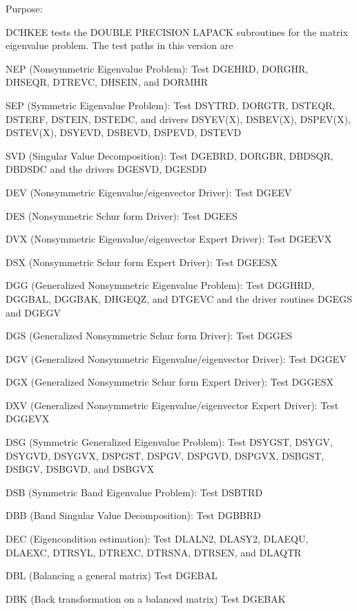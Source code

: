 \begin{DoxyParagraph}{Purpose\+: }
\begin{DoxyVerb} DCHKEE tests the DOUBLE PRECISION LAPACK subroutines for the matrix
 eigenvalue problem.  The test paths in this version are

 NEP (Nonsymmetric Eigenvalue Problem):
     Test DGEHRD, DORGHR, DHSEQR, DTREVC, DHSEIN, and DORMHR

 SEP (Symmetric Eigenvalue Problem):
     Test DSYTRD, DORGTR, DSTEQR, DSTERF, DSTEIN, DSTEDC,
     and drivers DSYEV(X), DSBEV(X), DSPEV(X), DSTEV(X),
                 DSYEVD,   DSBEVD,   DSPEVD,   DSTEVD

 SVD (Singular Value Decomposition):
     Test DGEBRD, DORGBR, DBDSQR, DBDSDC
     and the drivers DGESVD, DGESDD

 DEV (Nonsymmetric Eigenvalue/eigenvector Driver):
     Test DGEEV

 DES (Nonsymmetric Schur form Driver):
     Test DGEES

 DVX (Nonsymmetric Eigenvalue/eigenvector Expert Driver):
     Test DGEEVX

 DSX (Nonsymmetric Schur form Expert Driver):
     Test DGEESX

 DGG (Generalized Nonsymmetric Eigenvalue Problem):
     Test DGGHRD, DGGBAL, DGGBAK, DHGEQZ, and DTGEVC
     and the driver routines DGEGS and DGEGV

 DGS (Generalized Nonsymmetric Schur form Driver):
     Test DGGES

 DGV (Generalized Nonsymmetric Eigenvalue/eigenvector Driver):
     Test DGGEV

 DGX (Generalized Nonsymmetric Schur form Expert Driver):
     Test DGGESX

 DXV (Generalized Nonsymmetric Eigenvalue/eigenvector Expert Driver):
     Test DGGEVX

 DSG (Symmetric Generalized Eigenvalue Problem):
     Test DSYGST, DSYGV, DSYGVD, DSYGVX, DSPGST, DSPGV, DSPGVD,
     DSPGVX, DSBGST, DSBGV, DSBGVD, and DSBGVX

 DSB (Symmetric Band Eigenvalue Problem):
     Test DSBTRD

 DBB (Band Singular Value Decomposition):
     Test DGBBRD

 DEC (Eigencondition estimation):
     Test DLALN2, DLASY2, DLAEQU, DLAEXC, DTRSYL, DTREXC, DTRSNA,
     DTRSEN, and DLAQTR

 DBL (Balancing a general matrix)
     Test DGEBAL

 DBK (Back transformation on a balanced matrix)
     Test DGEBAK


\end{DoxyVerb}
\end{DoxyParagraph}

